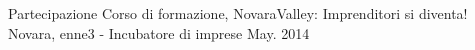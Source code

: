 









\begin{cvhonors}

  \cvhonor
    {Partecipazione} %
    {Corso di formazione, NovaraValley: Imprenditori si diventa!} %
    {Novara, enne3 - Incubatore di imprese} %
    {May. 2014} %

\end{cvhonors}

